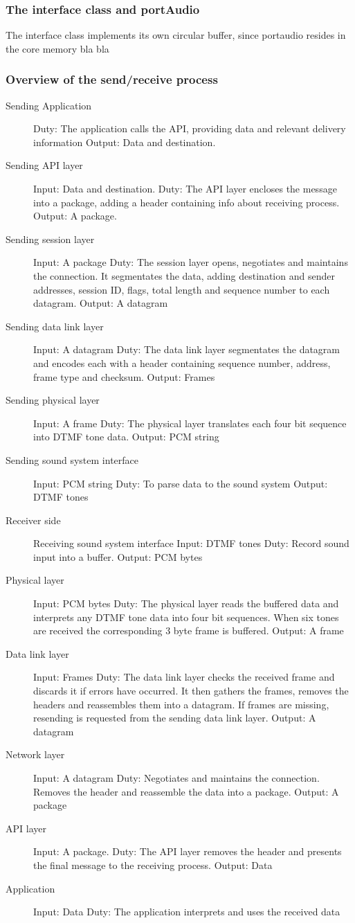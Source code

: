 \subsubsection{The interface class and portAudio}
The interface class implements its own circular buffer, since portaudio resides in the core memory bla bla


\subsubsection{Overview of the send/receive process}
\begin{description}
\item[Sending Application]
Duty: The application calls the API, providing data and relevant delivery information
Output: Data and destination.
\item[Sending API layer]
Input: Data and destination.
Duty: The API layer encloses the message into a package, adding a header containing info about receiving process.
Output: A package.
\item[Sending session layer]
Input: A package
Duty: The session layer opens, negotiates and maintains the connection. It segmentates the data, adding destination and sender addresses, session ID, flags, total length and sequence number to each datagram.
Output: A datagram
\item[Sending data link layer]
Input: A datagram
Duty: The data link layer segmentates the datagram and encodes each with a header containing sequence number, address, frame type and checksum.
Output: Frames
\item[Sending physical layer]
Input: A frame
Duty: The physical layer translates each four bit sequence into DTMF tone data.
Output: PCM string
\item[Sending sound system interface]
Input: PCM string
Duty: To parse data to the sound system
Output: DTMF tones
\item[Receiver side]
Receiving sound system interface
Input: DTMF tones
Duty: Record sound input into a buffer.
Output: PCM bytes
\item[Physical layer]
Input: PCM bytes
Duty: The physical layer reads the buffered data and interprets any DTMF tone data into four bit sequences. When six tones are received the corresponding 3 byte frame is buffered.
Output: A frame
\item[Data link layer]
Input: Frames
Duty: The data link layer checks the received frame and discards it if errors have occurred. It then gathers the frames, removes the headers and reassembles them into a datagram. If frames are missing, resending is requested from the sending data link layer.
Output: A datagram
\item[Network layer]
Input: A datagram
Duty: Negotiates and maintains the connection. Removes the header and reassemble the data into a package.
Output: A package
\item[API layer]
Input: A package.
Duty: The API layer removes the header and presents the final message to the receiving process.
Output: Data
\item[Application]
Input: Data
Duty: The application interprets and uses the received data
\end{description}